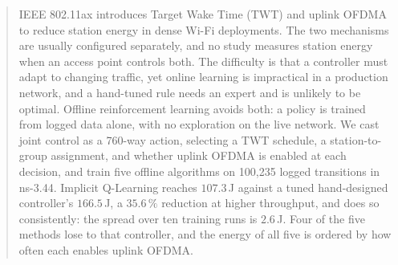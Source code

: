\begin{abstract}
IEEE 802.11ax introduces Target Wake Time (TWT) and uplink OFDMA to reduce
station energy in dense Wi-Fi deployments.
The two mechanisms are usually configured separately, and no study measures
station energy when an access point controls both.
The difficulty is that a controller must adapt to changing traffic, yet online
learning is impractical in a production network, and a hand-tuned rule needs an
expert and is unlikely to be optimal.
Offline reinforcement learning avoids both: a policy is trained from logged
data alone, with no exploration on the live network.
We cast joint control as a 760-way action, selecting a TWT schedule, a
station-to-group assignment, and whether uplink OFDMA is enabled at each
decision, and train five offline algorithms on 100{,}235 logged transitions in
ns-3.44.
Implicit Q-Learning reaches $107.3$\,J against a tuned hand-designed
controller's $166.5$\,J, a $35.6\,\%$ reduction at higher throughput, and does
so consistently: the spread over ten training runs is $2.6$\,J. Four of the
five methods lose to that controller, and the energy of all five is ordered by
how often each enables uplink OFDMA.
\end{abstract}
